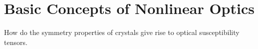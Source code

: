 \chapter{Basic Concepts of Nonlinear Optics}

How do the symmetry properties of crystals give rise to optical susceptibility tensors.